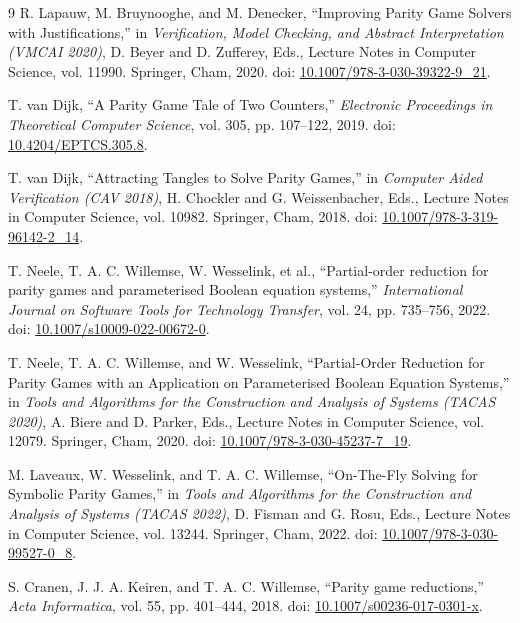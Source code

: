 \documentclass[11pt, a4paper]{article}
\begin{document}
\begin{thebibliography}{9}
R. Lapauw, M. Bruynooghe, and M. Denecker,
``Improving Parity Game Solvers with Justifications,''
in \textit{Verification, Model Checking, and Abstract Interpretation
(VMCAI 2020)},
D. Beyer and D. Zufferey, Eds.,
Lecture Notes in Computer Science, vol. 11990.
Springer, Cham, 2020.
doi: \href{https://doi.org/10.1007/978-3-030-39322-9_21}
{10.1007/978-3-030-39322-9\_21}.

T. van Dijk,
``A Parity Game Tale of Two Counters,''
\textit{Electronic Proceedings in Theoretical Computer Science},
vol. 305, pp. 107--122, 2019.
doi: \href{https://doi.org/10.4204/EPTCS.305.8}
{10.4204/EPTCS.305.8}.

T. van Dijk,
``Attracting Tangles to Solve Parity Games,''
in \textit{Computer Aided Verification (CAV 2018)},
H. Chockler and G. Weissenbacher, Eds.,
Lecture Notes in Computer Science, vol. 10982.
Springer, Cham, 2018.
doi: \href{https://doi.org/10.1007/978-3-319-96142-2_14}
{10.1007/978-3-319-96142-2\_14}.

T. Neele, T. A. C. Willemse, W. Wesselink, et al.,
``Partial-order reduction for parity games and parameterised Boolean equation systems,''
\textit{International Journal on Software Tools for Technology Transfer},
vol. 24, pp. 735--756, 2022.
doi: \href{https://doi.org/10.1007/s10009-022-00672-0}
{10.1007/s10009-022-00672-0}.

T. Neele, T. A. C. Willemse, and W. Wesselink,
``Partial-Order Reduction for Parity Games with an Application on Parameterised Boolean Equation Systems,''
in \textit{Tools and Algorithms for the Construction and Analysis of Systems (TACAS 2020)},
A. Biere and D. Parker, Eds.,
Lecture Notes in Computer Science, vol. 12079.
Springer, Cham, 2020.
doi: \href{https://doi.org/10.1007/978-3-030-45237-7_19}
{10.1007/978-3-030-45237-7\_19}.

M. Laveaux, W. Wesselink, and T. A. C. Willemse,
``On-The-Fly Solving for Symbolic Parity Games,''
in \textit{Tools and Algorithms for the Construction and Analysis of Systems (TACAS 2022)},
D. Fisman and G. Rosu, Eds.,
Lecture Notes in Computer Science, vol. 13244.
Springer, Cham, 2022.
doi: \href{https://doi.org/10.1007/978-3-030-99527-0_8}
{10.1007/978-3-030-99527-0\_8}.

S. Cranen, J. J. A. Keiren, and T. A. C. Willemse,
``Parity game reductions,''
\textit{Acta Informatica},
vol. 55, pp. 401--444, 2018.
doi: \href{https://doi.org/10.1007/s00236-017-0301-x}
{10.1007/s00236-017-0301-x}.


\end{thebibliography}
\end{document}
